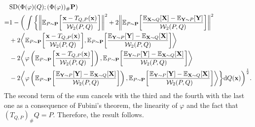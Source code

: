 \documentclass{imsart}
\numberwithin{equation}{section}
\def\E{\mathbb{E}}
\def\x{\mathbf{x}}
\def\X{\mathbf{X}}
\def\Y{\mathbf{Y}}
\def\E{\mathbb E}
\def\x{\mathbf x}
\begin{document}
\begin{align*}
	&\mathrm{SD}(\Phi(\varphi)(Q); (\Phi(\varphi))_\# {\bf P})\\
	=
	&1-  \bigg(\int \bigg\{  \bigg\| \E_{P\sim {\bf P}}  \bigg[  \frac{\x-T_{Q,P}(\x)}{\mathcal{W}_2(P,Q)}\bigg] \bigg\|^2+ 2\bigg\|\E_{P\sim {\bf P}}  \bigg[  \frac{\E_{\X\sim Q}[\X]-\E_{\Y\sim P}[\Y]}{\mathcal{W}_2(P,Q)} \bigg] \bigg\|^2\\
	& +2\bigg\langle \E_{P\sim {\bf P}}  \bigg[  \frac{\x-T_{Q,P}(\x)}{\mathcal{W}_2(P,Q)}\bigg], \E_{P\sim {\bf P}}  \bigg[  \frac{\E_{\Y\sim P}[\Y]-\E_{\X\sim Q}[\X]}{\mathcal{W}_2(P,Q)}\bigg]\bigg\rangle \\
	&  -2\bigg\langle \varphi\left(\E_{P\sim {\bf P}}  \bigg[  \frac{\x-T_{Q,P}(\x)}{\mathcal{W}_2(P,Q)}\bigg]\right), \E_{P\sim {\bf P}}  \bigg[  \frac{\E_{\Y\sim P}[\Y]-\E_{\X\sim Q}[\X]}{\mathcal{W}_2(P,Q)}\bigg]\bigg\rangle \\
	& -2\bigg\langle \varphi\left(\E_{P\sim {\bf P}}  \bigg[  \frac{\E_{\Y\sim P}[\Y]-\E_{\X\sim Q}[\X]}{\mathcal{W}_2(P,Q)}\bigg]\right), \E_{P\sim {\bf P}}  \bigg[  \frac{\E_{\Y\sim P}[\Y]-\E_{\X\sim Q}[\X]}{\mathcal{W}_2(P,Q)}\bigg]\bigg\rangle \bigg\}\mathrm{d}Q(\x)  \bigg)^{\frac{1}{2}}.
\end{align*}
The second term of the sum cancels with the third and the fourth with the last one as a consequence of Fubini's theorem, the linearity of $\varphi$ and the fact that $(T_{Q,P})_\#Q=P$. 
Therefore, the result follows. 
\end{document}
